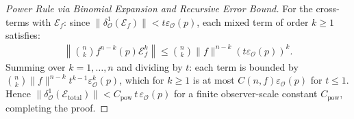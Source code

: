 \begin{proof}[Power Rule via Binomial Expansion and Recursive Error Bound]
For the cross-terms with $\mathcal{E}_f$: since $\|\delta^1_{\mathcal{O}}(\mathcal{E}_f)\| < t\varepsilon_{\mathcal{O}}(p)$, each mixed term of order $k\geq 1$ satisfies:
\begin{align}
\left\|\binom{n}{k}f^{n-k}(p)\mathcal{E}_f^k\right\| \leq \binom{n}{k}\|f\|^{n-k}(t\varepsilon_{\mathcal{O}}(p))^k.
\end{align}
Summing over $k=1,\ldots,n$ and dividing by $t$: each term is bounded by $\binom{n}{k}\|f\|^{n-k}t^{k-1}\varepsilon_{\mathcal{O}}^k(p)$, which for $k\geq 1$ is at most $C(n,f)\varepsilon_{\mathcal{O}}(p)$ for $t \leq 1$. Hence $\|\delta^1_{\mathcal{O}}(\mathcal{E}_{\text{total}})\| < C_{\text{pow}}\,t\,\varepsilon_{\mathcal{O}}(p)$ for a finite observer-scale constant $C_{\text{pow}}$, completing the proof.
\end{proof}

